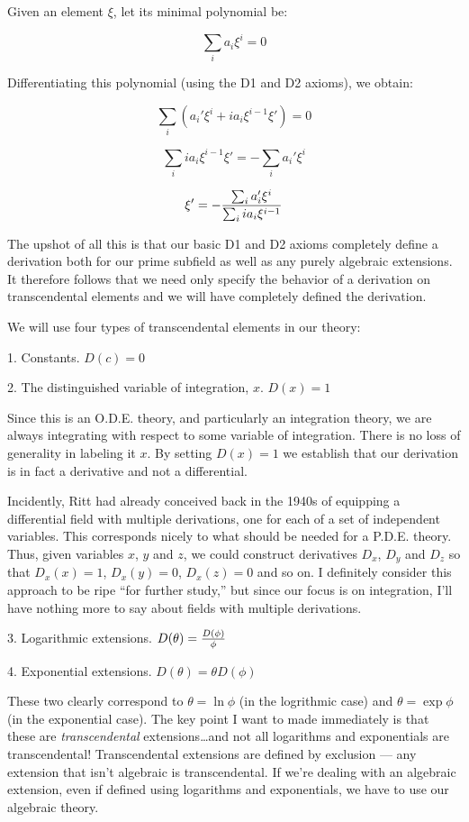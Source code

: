 \proof

Given an element $\xi$, let its minimal polynomial be:

$$\sum_i a_i \xi^i = 0$$

Differentiating this polynomial (using the D1 and D2 axioms), we obtain:

$$\sum_i (a_i' \xi^i + i a_i \xi^{i-1} \xi') = 0 $$

$$\sum_i i a_i \xi^{i-1} \xi' = - \sum_i a_i' \xi^i $$

$$\xi' = - {\sum_i a_i' \xi^i \over {\sum_i i a_i \xi^{i-1}}} $$

\endtheorem

The upshot of all this is that our basic D1 and D2 axioms completely
define a derivation both for our prime subfield as well as any purely
algebraic extensions.  It therefore follows that we need only specify
the behavior of a derivation on transcendental elements and we will
have completely defined the derivation.

We will use four types of transcendental elements in our theory:

1. Constants.  $D(c)=0$

2. The distinguished variable of integration, $x$.  $D(x)=1$

Since this is an O.D.E. theory, and particularly an integration
theory, we are always integrating with respect to some variable of
integration.  There is no loss of generality in labeling it $x$.  By
setting $D(x)=1$ we establish that our derivation is in fact a
derivative and not a differential.

Incidently, Ritt had already conceived back in the 1940s of equipping
a differential field with multiple derivations, one for each of a set
of independent variables.  This corresponds nicely to what should be
needed for a P.D.E. theory.  Thus, given variables $x$, $y$ and $z$,
we could construct derivatives $D_x$, $D_y$ and $D_z$ so that
$D_x(x)=1$, $D_x(y)=0$, $D_x(z)=0$ and so on.  I definitely consider
this approach to be ripe ``for further study,'' but since our focus is
on integration, I'll have nothing more to say about fields with
multiple derivations.

3. Logarithmic extensions. $D(\theta)={D(\phi)\over{\phi}}$

4. Exponential extensions. $D(\theta)=\theta D(\phi)$

These two clearly correspond to $\theta = \ln\phi$ (in the logrithmic
case) and $\theta = \exp\phi$ (in the exponential case).  The key
point I want to made immediately is that these are {\it
transcendental} extensions\ldots and not all logarithms and
exponentials are transcendental!  Transcendental extensions are
defined by exclusion --- any extension that isn't algebraic is
transcendental.  If we're dealing with an algebraic extension, even if
defined using logarithms and exponentials, we have to use our
algebraic theory.

